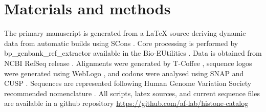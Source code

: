 \section{Materials and methods}
\label{sec:matmethods}

  The primary manuscript is generated from a \LaTeX{} source
  deriving dynamic data from automatic builds using SCons  \citep{SCons2005}.
  Core processing is performed by bp\_genbank\_ref\_extractor
  available in the Bio-EUtilities  \citep{BioPerl2002}.
  Data is obtained from NCBI RefSeq release  \citep{PruittRefseq2014}.
  Alignments were generated by T-Coffee   \citep{tcoffee2000},
  sequence logos were generated using WebLogo   \citep{weblogo},
  and codons were analysed using SNAP  \citep{KorberSNAP2000}
  and CUSP  \citep{Emboss2000}.
  Sequences are represented following Human Genome Variation Society recommended nomenclature \citep{mutnomenclature2003}.
  All scripts, latex sources, and current sequence files
  are available in a github repository \url{https://github.com/af-lab/histone-catalog}
